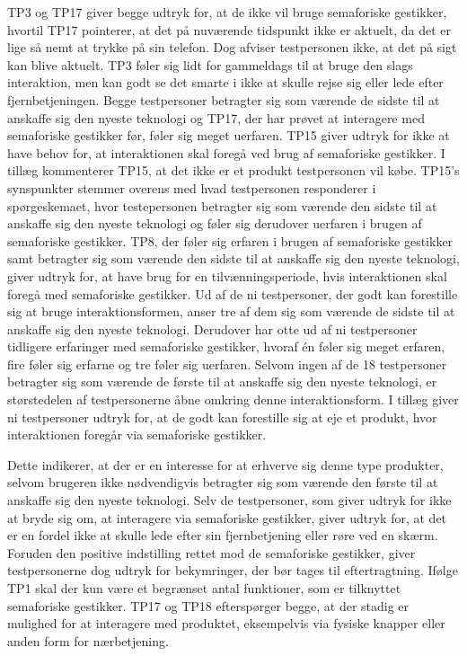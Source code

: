 TP3 og TP17 giver begge udtryk for, at de ikke vil bruge semaforiske gestikker, hvortil TP17 pointerer, at det på nuværende tidspunkt ikke er aktuelt, da det er lige så nemt at trykke på sin telefon. Dog afviser testpersonen ikke, at det på sigt kan blive aktuelt. TP3 føler sig lidt for gammeldags til at bruge den slags interaktion, men kan godt se det smarte i ikke at skulle rejse sig eller lede efter fjernbetjeningen. Begge testpersoner betragter sig som værende de sidste til at anskaffe sig den nyeste teknologi og TP17, der har prøvet at interagere med semaforiske gestikker før, føler sig meget uerfaren. TP15 giver udtryk for ikke at have behov for, at interaktionen skal foregå ved brug af semaforiske gestikker. I tillæg kommenterer TP15, at det ikke er et produkt testpersonen vil købe. TP15's synspunkter stemmer overens med hvad testpersonen responderer i spørgeskemaet, hvor testepersonen betragter sig som værende den sidste til at anskaffe sig den nyeste teknologi og føler sig derudover uerfaren i brugen af semaforiske gestikker. TP8, der føler sig erfaren i brugen af semaforiske gestikker samt betragter sig som værende den sidste til at anskaffe sig den nyeste teknologi, giver udtryk for, at have brug for en tilvænningsperiode, hvis interaktionen skal foregå med semaforiske gestikker.\blankline
%
Ud af de ni testpersoner, der godt kan forestille sig at bruge interaktionsformen, anser tre af dem sig som værende de sidste til at anskaffe sig den nyeste teknologi. Derudover har otte ud af ni testpersoner tidligere erfaringer med semaforiske gestikker, hvoraf én føler sig meget erfaren, fire føler sig erfarne og tre føler sig uerfaren. Selvom ingen af de 18 testpersoner betragter sig som værende de første til at anskaffe sig den nyeste teknologi, er størstedelen af testpersonerne åbne omkring denne interaktionsform. I tillæg giver ni testpersoner udtryk for, at de godt kan forestille sig at eje et produkt, hvor interaktionen foregår via semaforiske gestikker.

Dette indikerer, at der er en interesse for at erhverve sig denne type produkter, selvom brugeren ikke nødvendigvis betragter sig som værende den første til at anskaffe sig den nyeste teknologi. Selv de testpersoner, som giver udtryk for ikke at bryde sig om, at interagere via semaforiske gestikker, giver udtryk for, at det er en fordel ikke at skulle lede efter sin fjernbetjening eller røre ved en skærm.\blankline 
%
Foruden den positive indstilling rettet mod de semaforiske gestikker, giver testpersonerne dog udtryk for bekymringer, der bør tages til eftertragtning. Ifølge TP1 skal der kun være et begrænset antal funktioner, som er tilknyttet semaforiske gestikker. TP17 og TP18 efterspørger begge, at der stadig er mulighed for at interagere med produktet, eksempelvis via fysiske knapper eller anden form for nærbetjening.  

